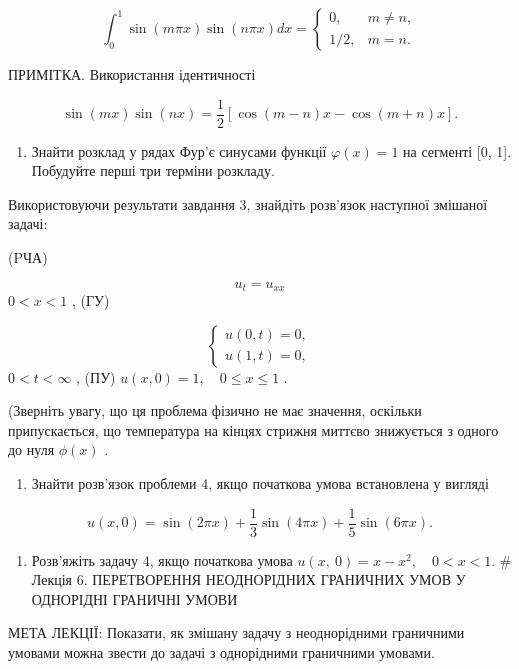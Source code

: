 \[\int_0^1 \sin(m\pi x) \sin(n\pi x) dx = \begin{cases} 0, & m \neq n, \\ 1/2, & m = n. \end{cases}\]

ПРИМІТКА. Використання ідентичності

\[\sin(mx)\sin(nx) = \frac{1}{2}[\cos(m-n)x - \cos(m+n)x].\]

\begin{enumerate}
\def\labelenumi{\arabic{enumi}.}
\setcounter{enumi}{2}
\tightlist
\item
  Знайти розклад у рядах Фур'є синусами функції \(\varphi(x) = 1\) на сегменті {[}0, 1{]}. Побудуйте перші три терміни розкладу.
\end{enumerate}

Використовуючи результати завдання 3, знайдіть розв'язок наступної змішаної задачі:

(PЧА)

\[u_t = u_{xx}\] \(0 < x < 1\) , (ГУ)

\[\begin{cases} u(0, t) = 0, \\ u(1, t) = 0, \end{cases}\] \(0 < t < \infty\) , (ПУ) \(u(x, 0) = 1, \quad 0 \le x \le 1\) .

(Зверніть увагу, що ця проблема фізично не має значення, оскільки припускається, що температура на кінцях стрижня миттєво знижується з одного до нуля \(\phi(x)\) .

\begin{enumerate}
\def\labelenumi{\arabic{enumi}.}
\setcounter{enumi}{4}
\tightlist
\item
  Знайти розв'язок проблеми 4, якщо початкова умова встановлена у вигляді
\end{enumerate}

\[u(x, 0) = \sin(2\pi x) + \frac{1}{3}\sin(4\pi x) + \frac{1}{5}\sin(6\pi x).\]

\begin{enumerate}
\def\labelenumi{\arabic{enumi}.}
\setcounter{enumi}{5}
\tightlist
\item
  Розв'яжіть задачу 4, якщо початкова умова \(u\left( x,\ 0\right) =x-x^{2},\quad 0< x<1.\) \# Лекція 6. ПЕРЕТВОРЕННЯ НЕОДНОРІДНИХ ГРАНИЧНИХ УМОВ У ОДНОРІДНІ ГРАНИЧНІ УМОВИ
\end{enumerate}

МЕТА ЛЕКЦІЇ: Показати, як змішану задачу з неоднорідними граничними умовами можна звести до задачі з однорідними граничними умовами.

